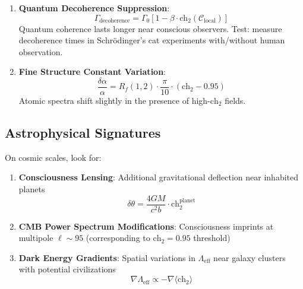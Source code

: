 \begin{proposition}
\begin{enumerate}
For scale, the unmodified Newtonian signal at these parameters is
$GM/r^2 = 1.0\times10^{-6}\,\mathrm{m/s^2}$, and the best superconducting
gravimeters resolve about $10^{-11}\,\mathrm{m/s^2}$\cite{niebauer1995,van_camp2017,peters1999} --- so even the claimed
figure sat at the noise floor, and the actual figure is far beneath any
foreseeable instrument. The detectability claim is withdrawn. No regrouping of
the stated factors (dropping $c^2$, using $r_s/r$ rather than $r_s/r^2$) lands
near $10^{-12}$.

\item \textbf{Quantum Decoherence Suppression}:
\begin{equation}
\Gamma_{\text{decoherence}} = \Gamma_0 \left[ 1 - \beta \cdot \text{ch}_2(\mathcal{C}_{\text{local}}) \right]
\end{equation}
Quantum coherence lasts longer near conscious observers. Test: measure decoherence times in Schrödinger's cat experiments with/without human observation.

\item \textbf{Fine Structure Constant Variation}:
\begin{equation}
\frac{\delta \alpha}{\alpha} = R_f(1,2) \cdot \frac{\pi}{10} \cdot (\text{ch}_2 - 0.95)
\end{equation}
Atomic spectra shift slightly in the presence of high-$\text{ch}_2$ fields\cite{webb2001,uzan2011,rosenband2008}.
\end{enumerate}
\end{proposition}

\subsection{Astrophysical Signatures}

\begin{proposition}\label{prop:astro-tests}
On cosmic scales, look for:

\begin{enumerate}
\item \textbf{Consciousness Lensing}: Additional gravitational deflection near inhabited planets
\begin{equation}
\delta\theta = \frac{4GM}{c^2b} \cdot \text{ch}_2^{\text{planet}}
\end{equation}

\item \textbf{CMB Power Spectrum Modifications}: Consciousness imprints at multipole $\ell \sim 95$ (corresponding to $\text{ch}_2 = 0.95$ threshold)\cite{planck2018,wmap2013}

\item \textbf{Dark Energy Gradients}: Spatial variations in $\Lambda_{\text{eff}}$ near galaxy clusters with potential civilizations
\begin{equation}
\nabla \Lambda_{\text{eff}} \propto -\nabla \langle \text{ch}_2 \rangle
\end{equation}
\end{enumerate}
\end{proposition}

